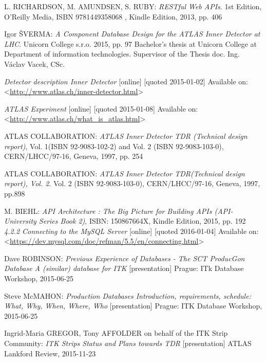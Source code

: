 \begin{thebibliography}{2}
\label{bibliography}

	 L. RICHARDSON, M. AMUNDSEN, S. RUBY: \emph{RESTful Web APIs}. 1st Edition, O’Reilly Media, ISBN 9781449358068 , Kindle Edition, 2013, pp. 406 
   
	 Igor ŠVERMA: \emph{A Component Database Design for the ATLAS Inner Detector at LHC}. Unicorn College s.r.o. 2015, pp. 97  Bachelor’s thesis at Unicorn College at Department  of information  technologies. Supervisor of the Thesis doc. Ing. Václav Vacek, CSc.

	 \emph{Detector description Inner Detector} [online] [quoted 2015-01-02] Available on: <\url{http://www.atlas.ch/inner-detector.html}>

	 \emph{ATLAS Experiment} [online] [quoted 2015-01-08] Available on: <\url{http://www.atlas.ch/what\_is\_atlas.html}>

	 ATLAS COLLABORATION: \emph{ATLAS Inner Detector TDR (Technical design report)}, Vol. 1(ISBN 92-9083-102-2) and Vol. 2 (ISBN 92-9083-103-0), CERN/LHCC/97-16, Geneva, 1997, pp. 254
    
	 ATLAS COLLABORATION: \emph{ATLAS Inner Detector TDR(Technical design report), Vol. 2}. Vol. 2 (ISBN 92-9083-103-0), CERN/LHCC/97-16, Geneva, 1997, pp.898
 
	 M. BIEHL: \emph{API Architecture : The Big Picture for Building APIs (API-University Series Book 2)}, ISBN: 150867664X, Kindle Edition, 2015,  pp. 192
	 \emph{4.2.2 Connecting to the MySQL Server} [online] [quoted 2016-01-04] Available on: <\url{https://dev.mysql.com/doc/refman/5.5/en/connecting.html}>
	
	 Dave ROBINSON: \emph{Previous Experience of Databases - The SCT ProducGon Database A (similar) database for ITK} 	[presentation] Prague: ITk Database Workshop, 2015-06-25
	
	 Steve McMAHON: \emph{Production Databases Introduction, requirements, schedule: What, Why, When, Where, Who} 	[presentation] Prague: ITK Database Workshop, 2015-06-25
	
	 Ingrid-Maria GREGOR, Tony AFFOLDER on behalf of the ITK Strip Community: \emph{ITK Strips Status and Plans towards TDR} [presentation] ATLAS Lankford Review, 2015-11-23
	

\end{thebibliography}
